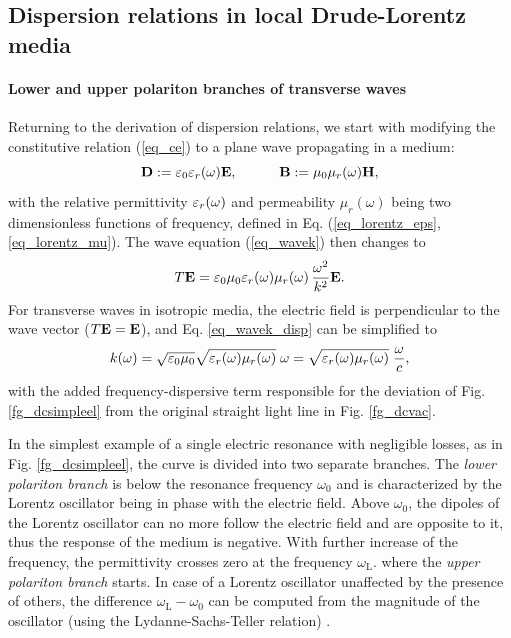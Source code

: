 \subsection{Dispersion relations in local Drude-Lorentz media} \label{disp_rel_local_media}
\paragraph{Lower and upper polariton branches of transverse waves}  %
Returning to the derivation of dispersion relations, we start with modifying the constitutive relation (\ref{eq_ce}) to a plane wave propagating in a medium:
\begin{equation}		\mathbf{D} := \varepsilon_0\varepsilon_r(\omega)	\mathbf{E}, \quad\quad\quad						\mathbf{B} := \mu_0\mu_r(\omega)		\mathbf{H},				 \label{eq_ce2}\end{equation}
with the relative permittivity $\varepsilon_r(\omega)$ and permeability $\mu_r(\omega)$ being two dimensionless functions of frequency, defined in Eq. (\ref{eq_lorentz_eps}, \ref{eq_lorentz_mu}). 
The wave equation (\ref{eq_wavek}) then changes to
\begin{equation}  T\mathbf{E} = \varepsilon_0 \mu_0  \varepsilon_r(\omega) \mu_r(\omega) \, \frac{ \omega^{2}}{k^2} \mathbf{E}.  \label{eq_wavek_disp}\end{equation}
For transverse waves in isotropic media, the electric field is perpendicular to the wave vector ($T\mathbf{E} = \mathbf{E}$), and Eq. \ref{eq_wavek_disp} can be simplified to  
\begin{equation} k(\omega) = \sqrt{\varepsilon_0 \mu_0} \sqrt{\varepsilon_r(\omega) \mu_{r}(\omega)}\;\omega = \sqrt{\varepsilon_r(\omega) \mu_{r}(\omega)}\; \frac{\omega}{c}, \label{eq_dispeq_loc}\end{equation}
with the added frequency-dispersive term responsible for the deviation of Fig. \ref{fg_dcsimpleel} from the original straight light line in Fig. \ref{fg_dcvac}. 





In the simplest example of a single electric resonance with negligible losses, as in Fig. \ref{fg_dcsimpleel}, the curve is divided into two separate branches. The \textit{lower polariton branch} is below the resonance frequency $\omega_0$ and is characterized by the Lorentz oscillator being in phase with the electric field. Above $\omega_0$, the dipoles of the Lorentz oscillator can no more follow the electric field and are opposite to it, thus the response of the medium is negative. With further increase of the frequency, the permittivity crosses zero at the frequency $\omega_{\text{L}}$. %
where the \textit{upper polariton branch} starts. In case of a Lorentz oscillator unaffected by the presence of others, the difference $\omega_{\text{L}} - \omega_0$ can be computed from the magnitude of the oscillator (using the Lydanne-Sachs-Teller relation) \cite{klingshirn2007semiconductor}.

